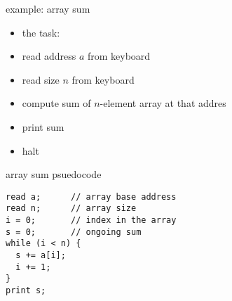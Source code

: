 \begin{frame}{example: array sum}
\begin{itemize}
\item the task:
\vspace{1cm}
\item read address $a$ from keyboard
\item read size $n$ from keyboard
\item compute sum of $n$-element array at that addres
\item print sum
\item halt
\end{itemize}
\end{frame}

\begin{frame}[fragile,label=arraySumPsuedo]{array sum psuedocode}
\begin{lstlisting}
read a;      // array base address
read n;      // array size
i = 0;       // index in the array
s = 0;       // ongoing sum
while (i < n) {
  s += a[i];
  i += 1;
}
print s;
\end{lstlisting}
\end{frame}



